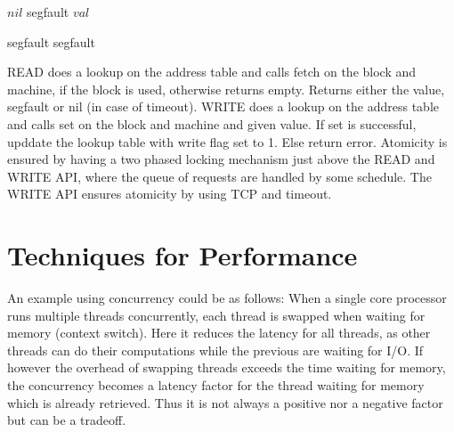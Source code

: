 \documentclass[a4paper, 11pt]{article}
\begin{document}
\begin{algorithmic}
    \State {}
    \State {}
    \State {}
        \State \Return $nil$
        \State segfault
        \State \Return $val$
    \EndIf
\EndFunction
\end{algorithmic}

\begin{algorithmic}
    \State {}
    \State {}
    \State {}
        \State segfault
        \State segfault
        \State \Return
    \EndIf
\EndFunction
\end{algorithmic}

READ does a lookup on the address table and calls fetch on the block and machine, if the block is used, otherwise returns empty. Returns either the value, segfault or nil (in case of timeout).
WRITE does a lookup on the address table and calls set on the block and machine and given value. If set is successful, upddate the lookup table with write flag set to 1. Else return error.
Atomicity is ensured by having a two phased locking mechanism just above the READ and WRITE API, where the queue of requests are handled by some schedule. The WRITE API ensures atomicity by using TCP and timeout.



\section{Techniques for Performance} %
\label{sec:techniques_for_performance}

An example using concurrency could be as follows: When a single core processor runs multiple threads concurrently, each thread is swapped when waiting for memory (context switch). Here it reduces the latency for all threads, as other threads can do their computations while the previous are waiting for I/O. If however the overhead of swapping threads exceeds the time waiting for memory, the concurrency becomes a latency factor for the thread waiting for memory which is already retrieved. Thus it is not always a positive nor a negative factor but can be a tradeoff.
\end{document}
